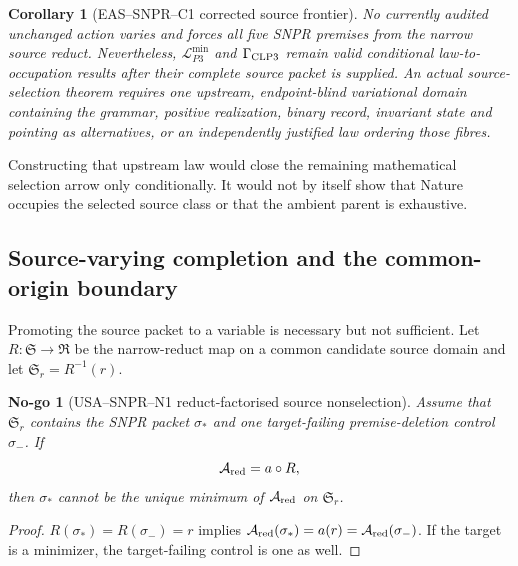 \documentclass[11pt,a4paper]{article}
\newtheorem{corollary}[definition]{Corollary}
\newtheorem{nogo}[definition]{No-go}
\theoremstyle{remark}
\begin{document}
\begin{corollary}[EAS--SNPR--C1 corrected source frontier]
No currently audited unchanged action varies and forces all five
SNPR premises from the narrow source reduct.  Nevertheless,
$\mathcal L_{P3}^{\min}$ and $\Gamma_{\rm CLP3}$ remain valid conditional
law-to-occupation results after their complete source packet is supplied.
An actual source-selection theorem requires one upstream, endpoint-blind
variational domain containing the grammar, positive realization, binary
record, invariant state and pointing as alternatives, or an independently
justified law ordering those fibres.
\label{cor:snprsourcefrontier}
\end{corollary}

Constructing that upstream law would close the remaining mathematical
selection arrow only conditionally.  It would not by itself show that Nature
occupies the selected source class or that the ambient parent is exhaustive.

\subsection{Source-varying completion and the common-origin boundary}

Promoting the source packet to a variable is necessary but not sufficient.
Let $R:\mathfrak S\to\mathfrak R$ be the narrow-reduct map on a common
candidate source domain and let $\mathfrak S_r=R^{-1}(r)$.

\begin{nogo}[USA--SNPR--N1 reduct-factorised source nonselection]
Assume that $\mathfrak S_r$ contains the SNPR packet $\sigma_*$ and one
target-failing premise-deletion control $\sigma_-$.  If
\begin{equation}
 \mathcal A_{\rm red}=a\circ R,
 \label{eq:snprfactoraction}
\end{equation}
then $\sigma_*$ cannot be the unique minimum of $\mathcal A_{\rm red}$ on
$\mathfrak S_r$.
\label{nogo:snprfactorisation}
\end{nogo}

\begin{proof}
$R(\sigma_*)=R(\sigma_-)=r$ implies
$\mathcal A_{\rm red}(\sigma_*)=a(r)=\mathcal A_{\rm red}(\sigma_-)$.  If
the target is a minimizer, the target-failing control is one as well.
\end{proof}
\end{document}
